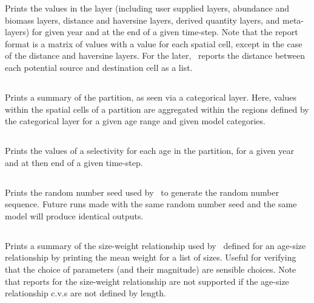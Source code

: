Prints the values in the layer (including user supplied layers, abundance and biomass layers, distance and haversine layers, derived quantity layers, and meta-layers) for given year and at the end of a given time-step. Note that the report format is a matrix of values with a value for each spatial cell, except in the case of the distance and haversine layers. For the later, \SPM\ reports the distance between each potential source and destination cell as a list.

\subsection{}

Prints a summary of the partition, as seen via a categorical layer. Here, values within the spatial cells of a partition are aggregated within the regions defined by the categorical layer for a given age range and given model categories.

\subsection{}

Prints the values of a selectivity for each age in the partition, for a given year and at then end of a given time-step.

\subsection{}

Prints the random number seed used by \SPM\ to generate the random number sequence. Future runs made with the same random number seed and the same model will produce identical outputs.

\subsection{\label{sec:report-size-weight}}

Prints a summary of the size-weight relationship used by \SPM\ defined for an age-size relationship by printing the mean weight for a list of sizes. Useful for verifying that the choice of parameters (and their magnitude) are sensible choices. Note that reports for the size-weight relationship are not supported if the age-size relationship c.v.s are not defined by length.

